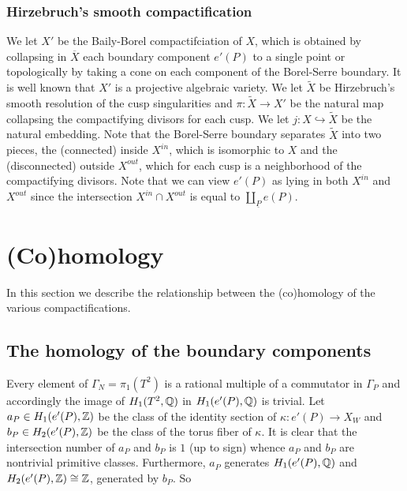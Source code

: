 \subsubsection{Hirzebruch's smooth compactification}\label{H-compact}

\vskip 0.3in 

We let $X'$ be the Baily-Borel compactifciation of $X$, which is obtained by collapsing in $\overline{X}$ each boundary component $e'(P)$ to a single point or topologically by taking a cone on each component of the Borel-Serre boundary. It is well known that $X'$ is a projective algebraic variety. We let $\tilde{X}$ be Hirzebruch's smooth resolution of the cusp singularities and $\pi:\tilde{X} \to X'$ be the natural map collapsing the compactifying divisors for each cusp. We let $j:X \hookrightarrow \tilde{X}$ be the natural embedding. Note that the Borel-Serre boundary separates $\tilde{X}$ into two pieces, the (connected) inside $X^{in}$, which is isomorphic to $X$ and the (disconnected) outside $X^{out}$, which for each cusp is a neighborhood of the compactifying divisors. Note that we can view $e'(P)$ as lying in both $X^{in}$ and $X^{out}$ since the intersection $X^{in} \cap X^{out}$ is equal to $ \coprod_{\underline{P}} e({P})$. 


\vskip 0.3in 

\section{(Co)homology}

\vskip 0.3in 

In this section we describe the relationship between the (co)homology of the various
compactifications. 

\vskip 0.3in 

\subsection{The homology of the boundary components}\label{boundaryhom}

\vskip 0.3in 

Every element of $\Gamma_N =\pi_1(T^2)$ is a rational multiple of a commutator in $\Gamma_P$ and accordingly the image of $H_1(T^2,\mathbb{Q})$ in $H_1(e'(P),\mathbb{Q})$ is trivial.
Let $a_P \in H_1(e'(P),\mathbb{Z})$ be the class of the identity section of $\kappa:e'(P) \to X_W$ and $b_P \in H_2(e'(P),\mathbb{Z})$ be the class of the torus fiber of $\kappa$. It is clear that the intersection number of $a_P$ and $b_P$ is $1$ (up to sign) whence $a_P$ and $b_P$ are nontrivial primitive classes. Furthermore, $a_P$ generates $H_1(e'(P),\mathbb{Q})$ and $ H_2(e'(P),\mathbb{Z})  \cong \mathbb{Z}$, generated by $b_P$. So

